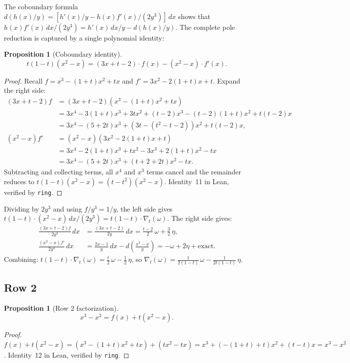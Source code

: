 \documentclass[11pt]{article}
\theoremstyle{plain}
\newtheorem{proposition}[theorem]{Proposition}
\theoremstyle{definition}
\theoremstyle{remark}
\begin{document}
The coboundary formula $d(h(x)/y) = [h'(x)/y - h(x)f'(x)/(2y^3)]\,dx$
shows that $h(x)f'(x)\,dx/(2y^3) = h'(x)\,dx/y - d(h(x)/y)$.
The complete pole reduction is captured by a single polynomial identity:

\begin{proposition}[Coboundary identity]\label{prop:coboundary}
\[
  t(1-t)(x^2-x) = (3x+t-2)\cdot f(x) - (x^2-x)\cdot f'(x).
\]
\end{proposition}
\begin{proof}
Recall $f = x^3 - (1+t)x^2 + tx$ and $f' = 3x^2 - 2(1+t)x + t$.
Expand the right side:
\begin{align*}
  (3x+t-2)f &= (3x+t-2)(x^3 - (1+t)x^2 + tx) \\
    &= 3x^4 - 3(1+t)x^3 + 3tx^2 + (t-2)x^3 - (t-2)(1+t)x^2 + t(t-2)x \\
    &= 3x^4 -(5+2t)x^3 + (3t - (t^2-t-2))x^2 + t(t-2)x, \\
  (x^2-x)f' &= (x^2-x)(3x^2 - 2(1+t)x + t) \\
    &= 3x^4 - 2(1+t)x^3 + tx^2 - 3x^3 + 2(1+t)x^2 - tx \\
    &= 3x^4 - (5+2t)x^3 + (t + 2 + 2t)x^2 - tx.
\end{align*}
Subtracting and collecting terms, all $x^4$ and $x^3$ terms cancel and
the remainder reduces to $t(1-t)(x^2 - x) = (t-t^2)(x^2-x)$.
Identity~11 in Lean, verified by \texttt{ring}.
\end{proof}

\noindent
Dividing by $2y^3$ and using $f/y^3 = 1/y$, the left side gives
$t(1-t) \cdot (x^2-x)\,dx/(2y^3) = t(1-t)\cdot\nabla_t(\omega)$.
The right side gives:
\begin{align*}
  \frac{(3x+t-2)f}{2y^3}\,dx &= \frac{(3x+t-2)}{2y}\,dx
    = \tfrac{t-2}{2}\,\omega + \tfrac{3}{2}\,\eta, \\
  \frac{(x^2-x)f'}{2y^3}\,dx &= \frac{2x-1}{y}\,dx - d\!\left(\frac{x^2-x}{y}\right)
    = -\omega + 2\eta + \text{exact}.
\end{align*}
Combining: $t(1-t)\cdot\nabla_t(\omega) = \frac{t}{2}\,\omega - \frac{1}{2}\,\eta$,
so $\nabla_t(\omega) = \frac{1}{2(1-t)}\,\omega - \frac{1}{2t(1-t)}\,\eta$.

\subsection{Row 2}

\begin{proposition}[Row 2 factorization]\label{prop:row2}
\[
  x^3 - x^2 = f(x) + t(x^2-x).
\]
\end{proposition}
\begin{proof}
$f(x) + t(x^2 - x) = (x^3 - (1+t)x^2 + tx) + (tx^2 - tx)
= x^3 + (-(1+t) + t)x^2 + (t - t)x = x^3 - x^2$.
Identity~12 in Lean, verified by \texttt{ring}.
\end{proof}
\end{document}
